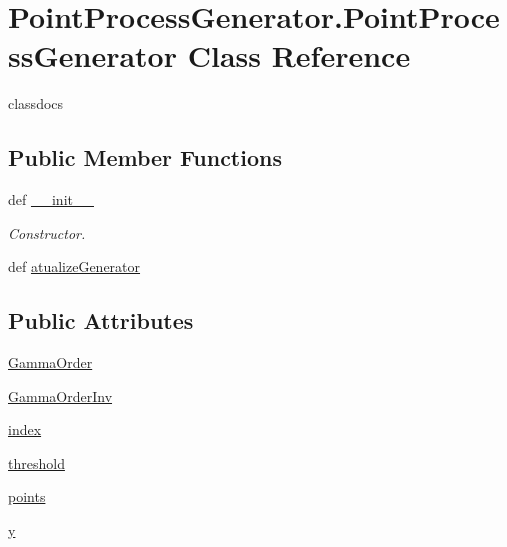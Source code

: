 \hypertarget{class_point_process_generator_1_1_point_process_generator}{\section{Point\-Process\-Generator.\-Point\-Process\-Generator Class Reference}
\label{class_point_process_generator_1_1_point_process_generator}
}


classdocs  


\subsection*{Public Member Functions}
\begin{DoxyCompactItemize}
\item 
def \hyperlink{class_point_process_generator_1_1_point_process_generator_af40e8d97d489b9ef5ce0446ea327ce93}{\-\_\-\-\_\-init\-\_\-\-\_\-}
\begin{DoxyCompactList}\small\item\em Constructor. \end{DoxyCompactList}\item 
def \hyperlink{class_point_process_generator_1_1_point_process_generator_a9e80adf5fea28ec4adb90489f0c42670}{atualize\-Generator}
\end{DoxyCompactItemize}
\subsection*{Public Attributes}
\begin{DoxyCompactItemize}
\item 
\hyperlink{class_point_process_generator_1_1_point_process_generator_aa6c6513cd7f00dbdceb5f945a07cffee}{Gamma\-Order}
\item 
\hyperlink{class_point_process_generator_1_1_point_process_generator_aa70be756b1535ff4512affa05a732fda}{Gamma\-Order\-Inv}
\item 
\hyperlink{class_point_process_generator_1_1_point_process_generator_a57f6c8af8fd3d37ed8ab2f4abe9be5d8}{index}
\item 
\hyperlink{class_point_process_generator_1_1_point_process_generator_abcb23e09b752b797a1f11f2679373ca1}{threshold}
\item 
\hyperlink{class_point_process_generator_1_1_point_process_generator_ab36d31f34c0330e13ae9732d53984bab}{points}
\item 
\hyperlink{class_point_process_generator_1_1_point_process_generator_a70a43b5c26daf20833ecbc9f4d979726}{y}
\end{DoxyCompactItemize}


